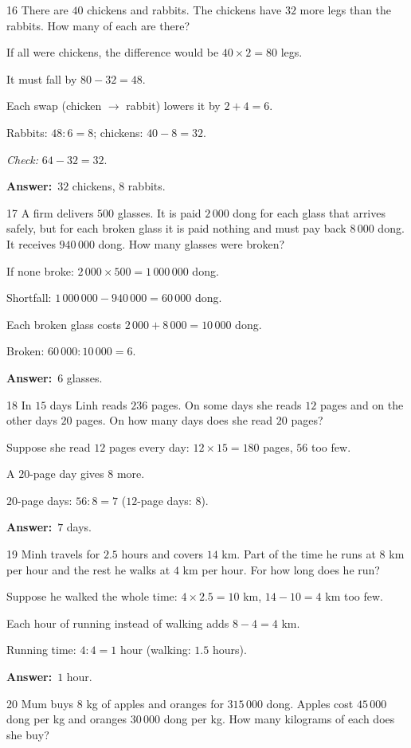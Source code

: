 \documentclass[11pt]{article}
\newif\ifsol \solfalse
\providecommand{\AnsWord}{Đáp số}
\newcommand{\dapso}[1]{\par\textbf{\AnsWord:}\ #1}
\newcommand{\probsol}[1]{%
  \begin{lrbox}{\solmeasure}\begin{minipage}{\dimexpr\linewidth-24pt\relax}#1\end{minipage}\end{lrbox}%
  \ifsol
    \begin{solbox}#1\end{solbox}%
  \else
    \setlength{\solht}{\dimexpr\ht\solmeasure+\dp\solmeasure+0.85cm\relax}%
    \ifdim\solht<1.35cm\setlength{\solht}{1.35cm}\fi
    \begin{tcolorbox}[colback=white,colframe=Line,boxrule=0.8pt,arc=5pt,
      left=8pt,right=8pt,top=4pt,bottom=4pt,height=\solht]{\footnotesize\color{Slate}\itshape\WorkWord}\end{tcolorbox}%
  \fi}
\newcommand{\gap}{\vspace{0.3cm}}
\def\WorkWord{Your work:}
\def\AnsWord{Answer}
\begin{document}
\gap
\begin{probbox}{16}{\relax}
There are $40$ chickens and rabbits. The chickens have $32$ more legs than the rabbits. How many of each are there?
\end{probbox}
\probsol{
If all were chickens, the difference would be $40\times2=80$ legs.\par
It must fall by $80-32=48$.\par Each swap (chicken $\to$ rabbit) lowers it by $2+4=6$.\par
Rabbits: $48:6=8$; chickens: $40-8=32$.\par \emph{Check:} $64-32=32$.
\dapso{$32$ chickens, $8$ rabbits.}}
\gap
\begin{probbox}{17}{\relax}
A firm delivers $500$ glasses. It is paid $2\,000$ dong for each glass that arrives safely, but for each broken glass it is paid nothing and must pay back $8\,000$ dong. It receives $940\,000$ dong. How many glasses were broken?
\end{probbox}
\probsol{
If none broke: $2\,000\times500=1\,000\,000$ dong.\par
Shortfall: $1\,000\,000-940\,000=60\,000$ dong.\par
Each broken glass costs $2\,000+8\,000=10\,000$ dong.\par Broken: $60\,000:10\,000=6$.
\dapso{$6$ glasses.}}
\gap
\begin{probbox}{18}{\relax}
In $15$ days Linh reads $236$ pages. On some days she reads $12$ pages and on the other days $20$ pages. On how many days does she read $20$ pages?
\end{probbox}
\probsol{
Suppose she read $12$ pages every day: $12\times15=180$ pages, $56$ too few.\par
A $20$-page day gives $8$ more.\par $20$-page days: $56:8=7$ ($12$-page days: $8$).
\dapso{$7$ days.}}
\gap
\begin{probbox}{19}{\relax}
Minh travels for $2.5$ hours and covers $14$ km. Part of the time he runs at $8$ km per hour and the rest he walks at $4$ km per hour. For how long does he run?
\end{probbox}
\probsol{
Suppose he walked the whole time: $4\times2.5=10$ km, $14-10=4$ km too few.\par
Each hour of running instead of walking adds $8-4=4$ km.\par
Running time: $4:4=1$ hour (walking: $1.5$ hours).
\dapso{$1$ hour.}}
\gap
\begin{probbox}{20}{\relax}
Mum buys $8$ kg of apples and oranges for $315\,000$ dong. Apples cost $45\,000$ dong per kg and oranges $30\,000$ dong per kg. How many kilograms of each does she buy?
\end{probbox}
\end{document}
